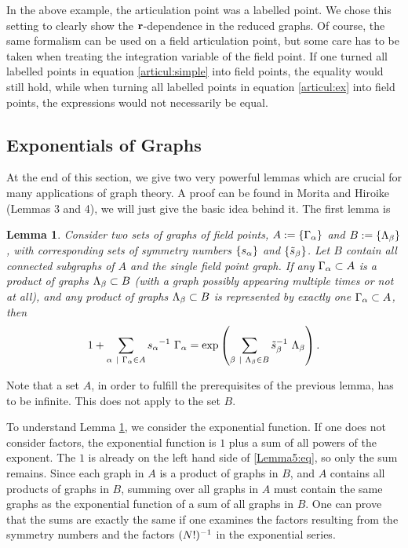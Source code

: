 \documentclass[8.5pt,twoside,twocolumn]{article}
\renewcommand\r{\bo r}
\theoremstyle{standard}
\newtheorem{lem}[theo]{Lemma}
\begin{document}
In the above example, the articulation point was a labelled point. We chose this
setting to clearly show the $\r$-dependence in the reduced graphs. Of course, the same
formalism can be used on a field articulation point, but some care has to be taken
when treating the integration variable of the field point. If one turned all labelled
points in equation \eqref{articul:simple} into field points, the equality would still hold,
while when turning all labelled points in equation \eqref{articul:ex} into field points,
the expressions would not necessarily be equal.

\subsection{Exponentials of Graphs}
At the end of this section, we give two very powerful lemmas which are crucial for many
applications of graph theory. A proof can be found in Morita and Hiroike \cite{MoritaHiroike} (Lemmas 3 and 4),
we will just give the basic idea behind it. The first lemma is

\begin{lem}
\label{lemma:exponential}
Consider two sets of graphs of field points, $A:=\left\{{\Gamma_{\alpha}} \right\}$ and $B:=\left\{{\Lambda_{\beta}} \right\}$,
with corresponding sets of symmetry numbers $\left\{{s_{\alpha}} \right\}$ and $\left\{{\tilde s_{\beta}} \right\}$.
Let $B$ contain all connected subgraphs of $A$ and the single field point graph. If any $\Gamma_{\alpha} \subset A$ is
a product of graphs $\Lambda_{\beta} \subset B$ (with a graph possibly appearing multiple times or not at all), and any
product of graphs $\Lambda_{\beta} \subset B$ is represented by exactly one $\Gamma_{\alpha} \subset A$, then
\begin{equation}
1 + \sum_{\al\ |\ \Ga_\al \in A} {s_\al}\iv\ \Ga_\al = \exp\lt(\sum_{\be\ |\ \La_\be \in B} {\tilde s_\be}\iv\ \La_\be \rt).
\label{Lemma5:eq}
\end{equation}
\end{lem}
Note that a set $A$, in order to fulfill the prerequisites of the previous lemma, has to be
infinite. This does not apply to the set $B$.

To understand Lemma \ref{lemma:exponential}, we consider the exponential function. If one does not
consider factors, the exponential function is $1$ plus a sum of all powers of the exponent.
The $1$ is already on the left hand side of \eqref{Lemma5:eq}, so only the sum remains. Since each graph in $A$ is a product of graphs in
$B$, and $A$ contains all products of graphs in $B$, summing over all graphs in $A$ must contain
the same graphs as the exponential function of a sum of all graphs in $B$. One can prove
that the sums are exactly the same if one examines the factors resulting from the symmetry
numbers and the factors $(N!)^{-1}$ in the exponential series.
\end{document}
